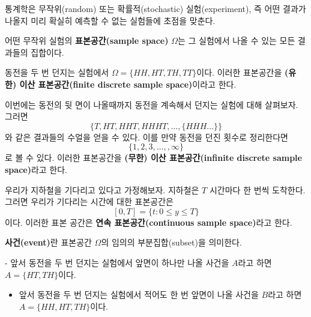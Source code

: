 \documentclass[b5paper,]{book}
\providecommand{\tightlist}{%
  \setlength{\itemsep}{0pt}\setlength{\parskip}{0pt}}
\theoremstyle{definition}
\theoremstyle{definition}
\theoremstyle{definition}
\theoremstyle{remark}
\let\BeginKnitrBlock\begin \let\EndKnitrBlock\end
\begin{document}
통계학은 무작위(random) 또는 확률적(stochastic) 실험(experiment), 즉
어떤 결과가 나올지 미리 확실히 예측할 수 없는 실험들에 초점을 맞춘다.

\BeginKnitrBlock{definition}[표본공간]
\protect\hypertarget{def:unnamed-chunk-10}{}{\label{def:unnamed-chunk-10}
{} }어떤 무작위 실험의 \textbf{표본공간(sample
space)} \(\Omega\)는 그 실험에서 나올 수 있는 모든 결과들의 집합이다.
\EndKnitrBlock{definition}

\BeginKnitrBlock{example}[동전 던지기 실험]
\protect\hypertarget{exm:unnamed-chunk-11}{}{\label{exm:unnamed-chunk-11}
{} }동전을 두 번 던지는 실험에서
\(\Omega=\{ HH, HT, TH, TT \}\)이다. 이러한 표본공간을 \textbf{(유한)
이산 표본공간(finite discrete sample space)}이라고 한다.
\EndKnitrBlock{example}

\BeginKnitrBlock{example}[동전 계속 던지기 실험]
\protect\hypertarget{exm:unnamed-chunk-12}{}{\label{exm:unnamed-chunk-12}
{} }이번에는 동전의 뒷 면이
나올때까지 동전을 계속해서 던지는 실험에 대해 살펴보자. 그러면
\[\{ T, HT, HHT, HHHT, \ldots, \{ HHH\ldots\} \}\] 와 같은 결과들의
수얼을 얻을 수 있다. 이를 만약 동전을 던진 횟수로 정리한다면
\[\{ 1,2,3,\ldots, ,\infty\}\] 로 볼 수 있다. 이러한 표본공간을
\textbf{(무한) 이산 표본공간(infinite discrete sample space)}라고 한다.
\EndKnitrBlock{example}

\BeginKnitrBlock{example}[지하철 도착 시간]
\protect\hypertarget{exm:unnamed-chunk-13}{}{\label{exm:unnamed-chunk-13}
{} }우리가 지하철을 기다리고 있다고
가정해보자. 지하철은 \(T\) 시간마다 한 번씩 도착한다. 그러면 우리가
기다리는 시간에 대한 표본공간은 \[[0,T]=\{t:0\leq y \leq T\}\] 이다.
이러한 표본 공간은 \textbf{연속 표본공간(continuous sample space)}라고
한다.
\EndKnitrBlock{example}

\BeginKnitrBlock{definition}[사건]
\protect\hypertarget{def:unnamed-chunk-14}{}{\label{def:unnamed-chunk-14}
{} }\textbf{사건(event)}란 표본공간 \(\Omega\)의
임의의 부분집합(subset)을 의미한다.
\EndKnitrBlock{definition}

\BeginKnitrBlock{example}[사건의 예]
\protect\hypertarget{exm:unnamed-chunk-15}{}{\label{exm:unnamed-chunk-15}
{} }- 앞서 동전을 두 번 던지는 실험에서 앞면이
하나만 나올 사건을 \(A\)라고 하면 \(A=\{ HT, TH \}\)이다.

\begin{itemize}
\tightlist
\item
  앞서 동전을 두 번 던지는 실험에서 적어도 한 번 앞면이 나올 사건을
  \(B\)라고 하면 \(A=\{ HH, HT, TH \}\)이다.
\end{itemize}
\EndKnitrBlock{example}
\end{document}
